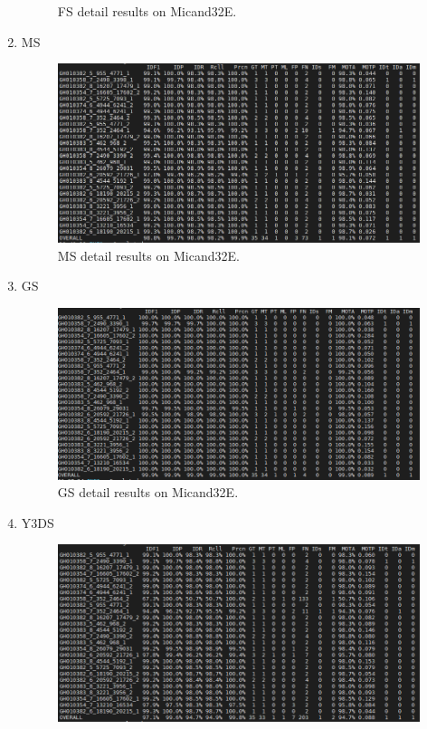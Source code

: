 \begin{enumerate}
\begin{figure}
			\caption{FS detail results on Micand32E.}
		\end{figure}
	\item MS
		\begin{figure}
			\centerline{\includegraphics[width=1\linewidth]{Figs/Evaluation/micand26/ms.png}}
			\caption{MS detail results on Micand32E.}
		\end{figure}
	\item GS
		\begin{figure}
			\centerline{\includegraphics[width=1\linewidth]{Figs/Evaluation/micand26/gs.png}}
			\caption{GS detail results on Micand32E.}
		\end{figure}
	\item Y3DS
		\begin{figure}
			\centerline{\includegraphics[width=1\linewidth]{Figs/Evaluation/micand26/y3ds.png}}

\end{figure}
\end{enumerate}
